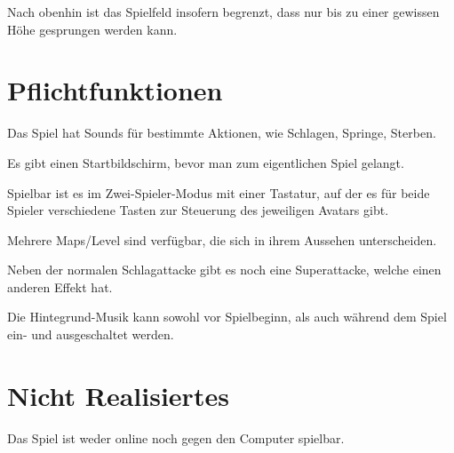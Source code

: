 \documentclass[11pt]{article}
\newcommand{\paragraphspace}{0.3cm}
\begin{document}
    \noindent
    Nach obenhin ist das Spielfeld insofern begrenzt, dass nur bis zu einer gewissen H\"ohe gesprungen werden kann.

    \section{Pflichtfunktionen}\label{sec:muss}
    Das Spiel hat Sounds f\"ur bestimmte Aktionen, wie Schlagen, Springe, Sterben.
    \vspace{\paragraphspace}

    \noindent
    Es gibt einen Startbildschirm, bevor man zum eigentlichen Spiel gelangt.
    \vspace{\paragraphspace}

    \noindent
    Spielbar ist es im \glqq Zwei-Spieler-Modus\grqq{} mit einer Tastatur, auf der es f\"ur beide Spieler verschiedene
    Tasten zur Steuerung des jeweiligen Avatars gibt.
    \vspace{\paragraphspace}

    \noindent
    Mehrere Maps/Level sind verf\"ugbar, die sich in ihrem Aussehen unterscheiden.
    \vspace{\paragraphspace}

    \noindent
    Neben der normalen Schlagattacke gibt es noch eine Superattacke, welche einen anderen Effekt hat.
    \vspace{\paragraphspace}

    \noindent
    Die Hintegrund-Musik kann sowohl vor Spielbeginn, als auch w\"ahrend dem Spiel ein- und ausgeschaltet werden.

    \section{Nicht Realisiertes}\label{sec:kann-nicht}

    Das Spiel ist weder online noch gegen den Computer spielbar.
    \vspace{\paragraphspace}
\end{document}

